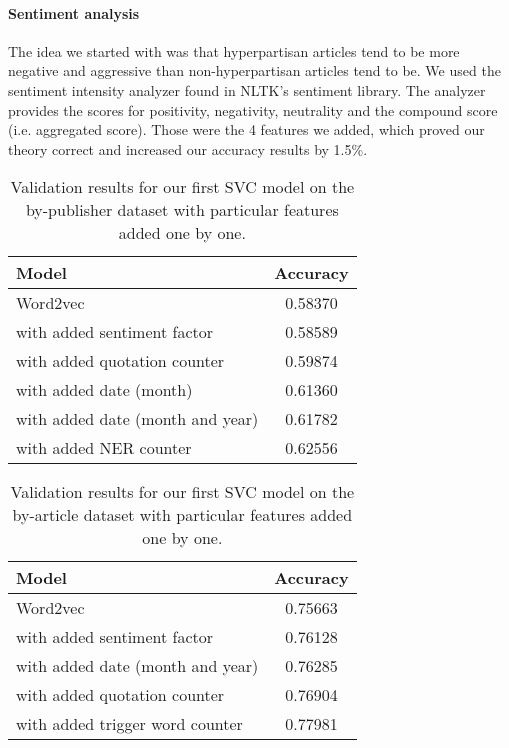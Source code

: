 \paragraph{Sentiment analysis\\}


The idea we started with was that hyperpartisan articles tend to be more negative and aggressive than non-hyperpartisan articles tend to be. We used the sentiment intensity analyzer found in NLTK's sentiment library. The analyzer provides the scores for positivity, negativity, neutrality and the compound score (i.e. aggregated score). Those were the 4 features we added, which proved our theory correct and increased our accuracy results by 1.5\%.


 \begin{table}
	\centering
	\small
	\begin{tabular}{lc}
		\toprule
		Model & Accuracy \\ 
		\midrule
		Word2vec & 0.58370 \\ 
		with added sentiment factor & 0.58589\\
		with added quotation counter & 0.59874 \\ 
		with added date (month) & 0.61360\\ 
		with added date (month and year) & 0.61782\\ 
		with added NER counter & 0.62556 \\  
		\bottomrule
	\end{tabular}
	\caption{Validation results for our first SVC model on the by-publisher dataset with particular features added one by one.}
	\label{table:bypublisher}
\end{table}

\begin{table}
	\centering
	\small
	\begin{tabular}{lc}
		\toprule
		Model & Accuracy \\
		\midrule
		Word2vec & 0.75663 \\
		with added sentiment factor & 0.76128\\
		with added date (month and year) & 0.76285\\
		with added quotation counter & 0.76904\\
		with added trigger word counter & 0.77981\\
		\bottomrule
	\end{tabular}
	\caption{Validation results for our first SVC model on the by-article dataset with particular features added one by one.}
	\label{table:byarticle}
\end{table}


